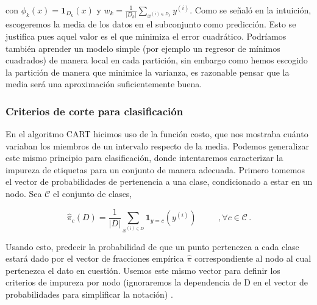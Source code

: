 con $\phi_k(x) = \mathbf{1}_{D_k}(x)$ y $w_k = \frac{1}{|D_k|} \sum_{x^{(i) \in D_k}} y^{(i)}$. Como se señaló en la intuición, escogeremos la media de los datos en el subconjunto como predicción. Esto se justifica pues aquel valor es el que minimiza el error cuadrático. Podríamos también aprender un modelo simple (por ejemplo un regresor de mínimos cuadrados) de manera local en cada partición, sin embargo como hemos escogido la partición de manera que minimice la varianza, es razonable pensar que la media será una aproximación suficientemente buena.


\subsubsection{Criterios de corte para clasificación}

En el algoritmo CART hicimos uso de la función costo, que nos mostraba cuánto variaban los miembros de un intervalo respecto de la media. Podemos generalizar este mismo principio para clasificación, donde intentaremos caracterizar la impureza de etiquetas para un conjunto de manera adecuada. Primero tomemos el vector de probabilidades de pertenencia a una clase, condicionado a estar en un nodo. Sea $\mathcal{C}$ el conjunto de clases,

\begin{equation}
    \hat \pi_c (D) = \frac{1}{|D|} \sum_{x^{(i) \in D}} \mathbf{1}_{y=c}(y^{(i)}) \hspace{1cm} \,, \forall c \in \mathcal{C} \,.
\end{equation}

Usando esto, predecir la probabilidad de que un punto pertenezca a cada clase estará dado por el vector de fracciones empírica $\hat \pi$ correspondiente al nodo al cual pertenezca el dato en cuestión. Usemos este mismo vector para definir los criterios de impureza por nodo (ignoraremos la dependencia de D en el vector de probabilidades para simplificar la notación) \cite{breiman_1984}.

